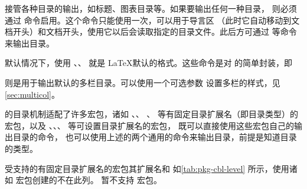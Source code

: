 \documentclass[twoside]{book}
\begin{document}
\WhuTeX 接管各种目录的输出，如标题、图表目录等。如果要输出任何一种目录，
则必须通过  命令启用。这个命令只能使用一次，可以用于导言区
（此时它自动移动到文档开头）和文档开头，使用它以后会读取指定的目录文件。此后方可通过
 等命令来输出目录。

默认情况下，使用 、、 就是
\LaTeX 默认的格式。这些命令是对  的简单封装，即

\begin{xample}
\DeclareRobustCommand\tableofcontents[1][columns=1]
  {\multicolplaincombinedlist[{#1}]{\contentsname}{toc}}
\DeclareRobustCommand\listoffigures[1][columns=1]
  {\multicolplaincombinedlist[{#1}]{\listfigurename}{lof}}
\DeclareRobustCommand\listoftables[1][columns=1]
  {\multicolplaincombinedlist[{#1}]{\listtablename}{lot}}
\stopxamplecode 
\xamplecode \medskip
\end{xample}

 则是用于输出默认的多栏目录。可以使用一个可选参数
设置多栏的样式，见\cref{sec:multicol}。

\WhuTeX 的目录机制适配了许多宏包，诸如 、、
、 等有固定目录扩展名（即目录类型）的宏包，以及
、、、 等可设置目录扩展名的宏包，
既可以直接使用这些宏包自己的输出目录的命令，
也可以使用上述的两个通用的命令来输出目录，前提是知道目录的类型。

受支持的有固定目录扩展名的宏包其扩展名和  
如\cref{tab:pkg-cbl-level} 所示，使用诸如  宏包创建的不在此列。
暂不支持  宏包。
\end{document}
